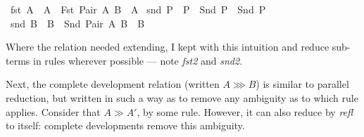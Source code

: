 \begin{implementation}
{\isacharbar}\ fst{}{\isacharcolon}\ {\isachardoublequoteopen}A\ {\isachargreater}{\isachargreater}\ A{\isacharprime}\ {\isasymLongrightarrow}\ {\isacharparenleft}Fst\ {\isacharparenleft}Pair\ A\ B{\isacharparenright}{\isacharparenright}\ {\isachargreater}{\isachargreater}\ A{\isacharprime}{\isachardoublequoteclose}\isanewline
{\isacharbar}\ snd{}{\isacharcolon}\ {\isachardoublequoteopen}P\ {\isachargreater}{\isachargreater}\ P{\isacharprime}\ {\isasymLongrightarrow}\ {\isacharparenleft}Snd\ P{\isacharparenright}\ {\isachargreater}{\isachargreater}\ {\isacharparenleft}Snd\ P{\isacharprime}{\isacharparenright}{\isachardoublequoteclose}\isanewline
{\isacharbar}\ snd{}{\isacharcolon}\ {\isachardoublequoteopen}B\ {\isachargreater}{\isachargreater}\ B{\isacharprime}\ {\isasymLongrightarrow}\ {\isacharparenleft}Snd\ {\isacharparenleft}Pair\ A\ B{\isacharparenright}{\isacharparenright}\ {\isachargreater}{\isachargreater}\ B{\isacharprime}{\isachardoublequoteclose}
\end{implementation}

Where the relation needed extending, I kept with this intuition and reduce sub-terms in rules wherever possible --- note \emph{fst2} and \emph{snd2}.

Next, the complete development relation (written \(A \ggg B\)) is similar to parallel reduction, but written in such a way as to remove any ambiguity as to which rule applies.
Consider that \(A \gg A'\), by some rule.
However, it can also reduce by \emph{refl} to itself: complete developments remove this ambiguity.

